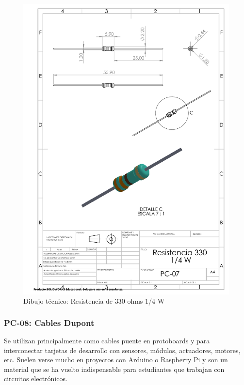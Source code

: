 \begin{figure}[H]
    \centering
    \includegraphics[trim = {7mm 1mm 1mm 1mm},clip,scale=0.4]{22/img/resistenciaDibujo.PDF}
    \caption{Dibujo técnico: Resistencia de 330 ohms 1/4 W}
    \label{fig:enter-label7}
\end{figure}


\subsubsection{PC-08: Cables Dupont }

Se utilizan principalmente como cables puente en protoboards y para interconectar tarjetas de desarrollo con sensores, módulos, actuadores, motores, etc. Suelen verse mucho en proyectos con Arduino o Raspberry Pi y son un material que se ha vuelto indispensable para estudiantes que trabajan con circuitos electrónicos. 


